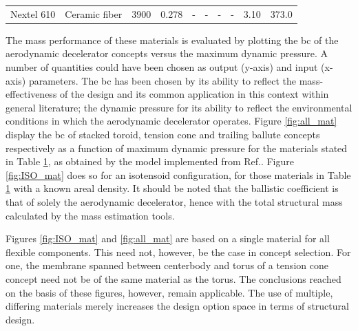 \begin{table}[H]
\begin{tabular}{p{}|p{}|p{}|p{}|p{}|p{}|p{}|p{}|p{}|p{}}
Nextel 610                   & Ceramic fiber                & 3900                                 & 0.278                                     & -                            & -                                & -                          & -                                & 3.10                       & 373.0                                       
\label{table:strucmatoverview}
\end{tabular}
\end{table}

The mass performance of these materials is evaluated by plotting the \acrfull{bc} of the aerodynamic decelerator concepts versus the maximum dynamic pressure. A number of quantities could have been chosen as output (y-axis) and input (x-axis) parameters. The \gls{bc} has been chosen by its ability to reflect the mass-effectiveness of the design and its common application in this context within general literature; the dynamic pressure for its ability to reflect the environmental conditions in which the aerodynamic decelerator operates. Figure \ref{fig:all_mat} display the \gls{bc} of stacked toroid, tension cone and trailing ballute concepts respectively as a function of maximum dynamic pressure for the materials stated in Table \ref{table:strucmatoverview}, as obtained by the model implemented from Ref.\cite{Samareh2011}. Figure \ref{fig:ISO_mat} does so for an isotensoid configuration, for those materials in Table \ref{table:strucmatoverview} with a known areal density. It should be noted that the ballistic coefficient is that of solely the aerodynamic decelerator, hence with the total structural mass calculated by the mass estimation tools.

Figures \ref{fig:ISO_mat} and \ref{fig:all_mat} are based on a single material for all flexible components. This need not, however, be the case in concept selection. For one, the membrane spanned between centerbody and torus of a tension cone concept need not be of the same material as the torus. The conclusions reached on the basis of these figures, however, remain applicable. The use of multiple, differing materials merely increases the design option space in terms of structural design.

